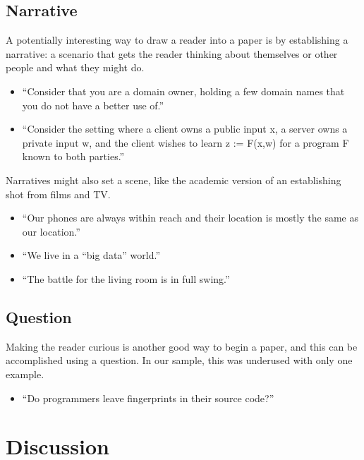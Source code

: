 \documentclass[sigconf,anonymous]{acmart}
\begin{document}
	\subsection{Narrative}
	
	A potentially interesting way to draw a reader into a paper is by establishing a narrative: a scenario that gets the reader thinking about themselves or other people and what they might do.  
	\begin{itemize}
		\item 	``Consider that you are a domain owner, holding a few domain names that you do not have a better use of.''
		
		\item 	``Consider the setting where a client owns a public input x, a server owns a private input w, and the client wishes to learn z := F(x,w) for a program F known to both parties.''
			\end{itemize}

Narratives might also set a scene, like the academic version of an establishing shot from films and TV.
		
			\begin{itemize}

		\item 	``Our phones are always within reach and their location is mostly the same as our location.''
		
		\item 	``We live in a “big data” world.''
		
		\item 	``The battle for the living room is in full swing.''
	\end{itemize}
	
	
	\subsection{Question} 
	
	Making the reader curious is another good way to begin a paper, and this can be accomplished using a question. In our sample, this was underused with only one example.
	\begin{itemize}
		\item ``Do programmers leave fingerprints in their source code?''
	\end{itemize}
	
	
\section{Discussion}
\label{sec:disc}
	
\end{document}
